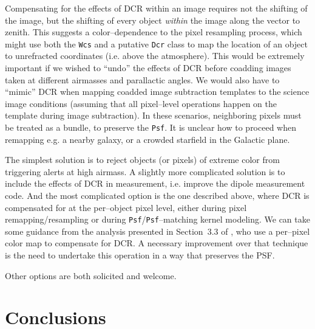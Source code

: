 \documentclass[prd, nofootinbib, floatfix, 11pt, tightenlines, times]{article}
\begin{document}
Compensating for the effects of DCR within an image requires not the
shifting of the image, but the shifting of every object {\it within}
the image along the vector to zenith.  This suggests a
color--dependence to the pixel resampling process, which might use both
the {\tt Wcs} and a putative {\tt Dcr} class to map the location of an
object to unrefracted coordinates (i.e. above the atmosphere).  This
would be extremely important if we wished to ``undo'' the effects of
DCR before coadding images taken at different airmasses and
parallactic angles.  We would also have to ``mimic'' DCR when mapping
coadded image subtraction templates to the science image conditions
(assuming that all pixel--level operations happen on the template
during image subtraction).  In these scenarios, neighboring pixels
must be treated as a bundle, to preserve the {\tt Psf}.  It is unclear
how to proceed when remapping e.g. a nearby galaxy, or a crowded
starfield in the Galactic plane.

The simplest solution is to reject objects (or pixels) of extreme
color from triggering alerts at high airmass.  A slightly more
complicated solution is to include the effects of DCR in measurement,
i.e. improve the dipole measurement code.  And the most complicated
option is the one described above, where DCR is compensated for at the
per--object pixel level, either during pixel remapping/resampling or
during {\tt Psf}/{\tt Psf}--matching kernel modeling.  We can take
some guidance from the analysis presented in Section~3.3 of
\cite{1999ApJ...521..602A}, who use a per--pixel color map to
compensate for DCR.  A necessary improvement over that technique is
the need to undertake this operation in a way that preserves the PSF.

Other options are both solicited and welcome.

\section{Conclusions}
\end{document}
